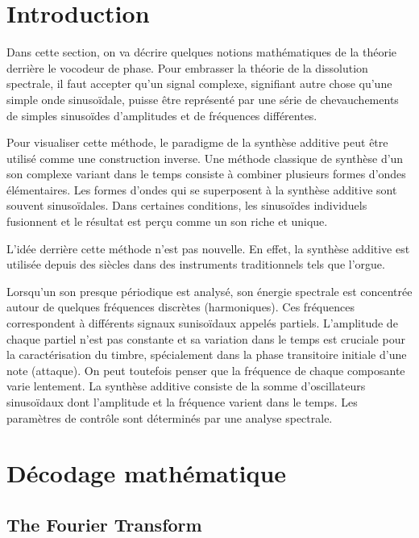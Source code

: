 
\label{ch:Context théoritique}

\section{Introduction}

Dans cette section, on va décrire quelques notions mathématiques de la théorie derrière le vocodeur de phase. Pour embrasser la théorie de la dissolution spectrale, il faut accepter qu'un signal complexe, signifiant autre chose qu'une simple onde sinusoïdale, puisse être représenté par une série de chevauchements de simples sinusoïdes d'amplitudes et de fréquences différentes.

Pour visualiser cette méthode, le paradigme de la synthèse additive peut être utilisé comme une construction inverse. Une méthode classique de synthèse d'un son complexe variant dans le temps consiste à combiner plusieurs formes d'ondes élémentaires. Les formes d'ondes qui se superposent à la synthèse additive sont souvent sinusoïdales. Dans certaines conditions, les sinusoïdes individuels fusionnent et le résultat est perçu comme un son riche et unique.

L'idée derrière cette méthode n'est pas nouvelle. En effet, la synthèse additive est utilisée depuis des siècles dans des instruments traditionnels tels que l’orgue.

Lorsqu'un son presque périodique est analysé, son énergie spectrale est concentrée autour de quelques fréquences discrètes (harmoniques). Ces fréquences correspondent à différents signaux sunisoïdaux appelés partiels. L'amplitude de chaque partiel n'est pas constante et sa variation dans le temps est cruciale pour la caractérisation du timbre, spécialement dans la phase transitoire initiale d’une note (attaque). On peut toutefois penser que la fréquence de chaque composante varie lentement. La synthèse additive consiste de la somme d'oscillateurs sinusoïdaux dont l'amplitude et la fréquence varient dans le temps. Les paramètres de contrôle sont déterminés par une analyse spectrale.

\section{Décodage mathématique}

    \subsection{The Fourier Transform}

